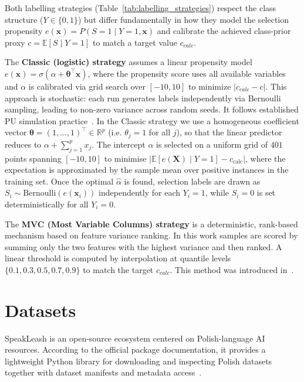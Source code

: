 \documentclass[applsci,article,submit,pdftex,moreauthors]{Definitions/mdpi}
\begin{document}
Both labelling strategies (Table~\ref{tab:labelling_strategies}) respect the class structure ($Y \in \{0, 1\}$) but differ fundamentally in how they model the selection propensity $e(\mathbf{x}) = P(S=1 \mid Y=1, \mathbf{x})$ and calibrate the achieved class-prior proxy $c = \mathbb{E}[S \mid Y=1]$ to match a target value $c_{calc}$.

The \textbf{Classic (logistic) strategy} assumes a linear propensity model $e(\mathbf{x}) = \sigma(\alpha + \boldsymbol{\theta}^\top \mathbf{x})$, where the propensity score uses all available variables and $\alpha$ is calibrated via grid search over $[-10, 10]$ to minimize $|c_{calc} - c|$. This approach is stochastic: each run generates labels independently via Bernoulli sampling, leading to non-zero variance across random seeds. It follows established PU simulation practice~\cite{pu_classic_propensity}. In the Classic strategy we use a homogeneous coefficient vector $\boldsymbol{\theta} = (1, \dots, 1)^\top \in \mathbb{R}^p$ (i.e. $\theta_j = 1$ for all $j$), so that the linear predictor reduces to $\alpha + \sum_{j=1}^p x_j$. The intercept $\alpha$ is selected on a uniform grid of $401$ points spanning $[-10, 10]$ to minimise $\bigl|\mathbb{E}[e(\mathbf{X})\mid Y=1] - c_{\mathrm{calc}}\bigr|$, where the expectation is approximated by the sample mean over positive instances in the training set. Once the optimal $\hat{\alpha}$ is found, selection labels are drawn as $S_i \sim \mathrm{Bernoulli}(e(\mathbf{x}_i))$ independently for each $Y_i = 1$, while $S_i = 0$ is set deterministically for all $Y_i = 0$.

The \textbf{MVC (Most Variable Columns) strategy} is a deterministic, rank-based mechanism based on feature variance ranking. In this work samples are scored by summing only the two features with the highest variance and then ranked. A linear threshold is computed by interpolation at quantile levels $\{0.1, 0.3, 0.5, 0.7, 0.9\}$ to match the target $c_{calc}$. This method was introduced in~\cite{mdai25_mvc}.



\section{Datasets}
SpeakLeash is an open-source ecosystem centered on Polish-language AI resources. According to the official package documentation, it provides a lightweight Python library for downloading and inspecting Polish datasets together with dataset manifests and metadata access~\cite{speakleash}.
\end{document}
